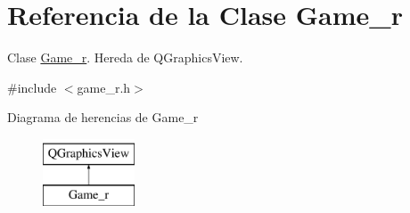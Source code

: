 \hypertarget{classGame__r}{\section{Referencia de la Clase Game\-\_\-r}
\label{classGame__r}
}


Clase \hyperlink{classGame__r}{Game\-\_\-r}. Hereda de Q\-Graphics\-View.  




{\ttfamily \#include $<$game\-\_\-r.\-h$>$}

Diagrama de herencias de Game\-\_\-r\begin{figure}[H]
\begin{center}
\leavevmode
\includegraphics[height=2.000000cm]{classGame__r}
\end{center}
\end{figure}
